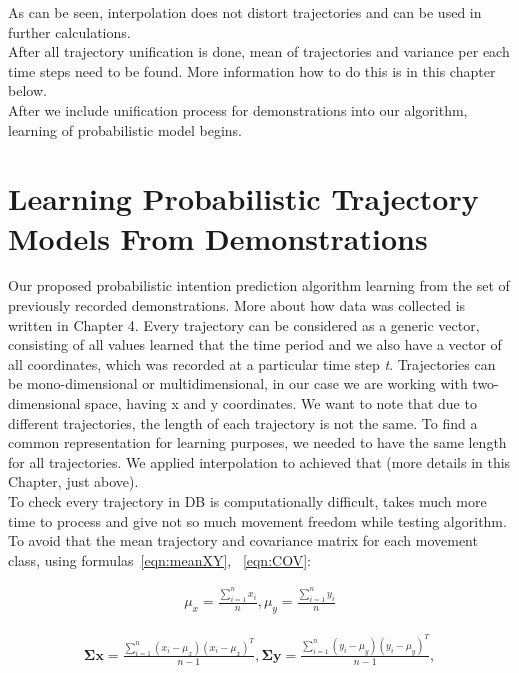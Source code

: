 As can be seen, interpolation does not distort trajectories and can be used in further calculations.\\
After all trajectory unification is done, mean of trajectories and variance per each time steps need to be found. More information how to do this is in this chapter below. \\
After we include unification process for demonstrations into our algorithm, learning of probabilistic model begins.

\section{Learning Probabilistic Trajectory Models From Demonstrations}

Our proposed probabilistic intention prediction algorithm learning from the set of previously recorded demonstrations. More about how data was collected is written in Chapter 4. Every trajectory can be considered as a generic vector, consisting of all values learned that the time period and we also have a vector of all coordinates, which was recorded at a particular time step \textit{t}. Trajectories can be mono-dimensional or multidimensional, in our case we are working with two-dimensional space, having x and y coordinates. We want to note that due to different trajectories, the length of each trajectory is not the same. To find a common representation for learning purposes, we needed to have the same length for all trajectories. We applied interpolation to achieved that (more details in this Chapter, just above). \\
To check every trajectory in \gls{DB} is computationally difficult, takes much more time to process and give not so much movement freedom while testing algorithm. To avoid that the mean trajectory and covariance matrix for each movement class, using formulas~\ref{eqn:meanXY}, ~\ref{eqn:COV}:

\begin{equation}
\begin{split}
\mu_x = \displaystyle \frac{\sum_{i=1}^{n} x_i}{n},     \mu_y = \displaystyle \frac{\sum_{i=1}^{n} y_i}{n}
\end{split}
\label{eqn:meanXY}
\end{equation}

\begin{equation}
\begin{split}
\bm{\Sigma{x}} = \displaystyle \frac{\sum_{i=1}^{n} (x_i - \mu_{x}) (x_i - \mu_{x})^T}{n-1}, \bm{\Sigma{y}} = \displaystyle \frac{\sum_{i=1}^{n} (y_i - \mu_{y}) (y_i - \mu_{y})^T}{n-1},  
\end{split}
\label{eqn:COV}
\end{equation}

